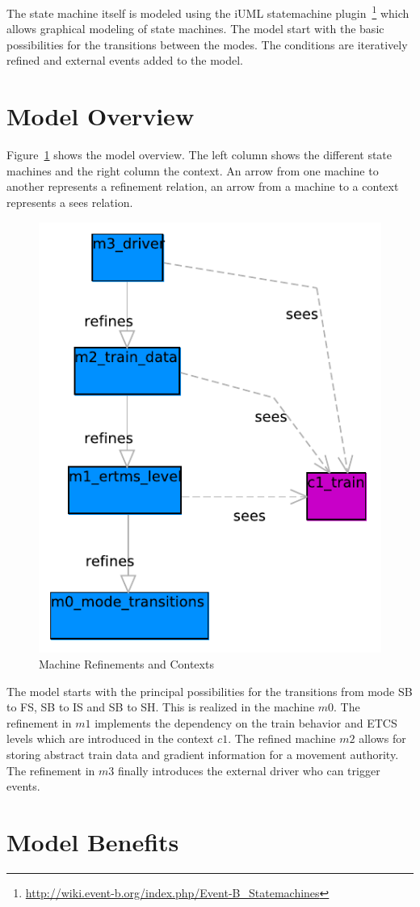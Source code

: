 \documentclass{template/openetcs_article}
\begin{document}
The state machine itself is modeled using the iUML statemachine
plugin~\footnote{\url{http://wiki.event-b.org/index.php/Event-B_Statemachines}}
which allows graphical modeling of state machines. The model start with the
basic possibilities for the transitions between the modes. The conditions are
iteratively refined and external events added to the model.

\section{Model Overview}
\label{sec:model-overview}

Figure~\ref{fig:model-overview} shows the model overview. The left column shows
the different state machines and the right column the context. An arrow from one
machine to another represents a refinement relation, an arrow from a machine to
a context represents a sees relation.

\begin{figure}[ht]
  \centering
  \includegraphics[width=.35\textwidth]{Subset_026_Chap_4_6}
  \caption{Machine Refinements and Contexts}
  \label{fig:model-overview}
\end{figure}

The model starts with the principal possibilities for the transitions from mode
SB to FS, SB to IS and SB to SH. This is realized in the machine $m0$. The
refinement in $m1$ implements the dependency on the train behavior and ETCS
levels which are introduced in the context $c1$. The refined machine $m2$ allows
for storing abstract train data and gradient information for a movement
authority. The refinement in $m3$ finally introduces the external driver who can
trigger events.

\section{Model Benefits}
\label{sec:model-highlights}
\end{document}
